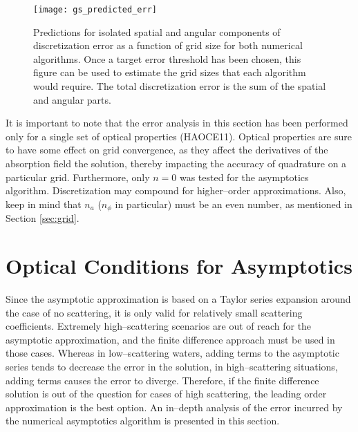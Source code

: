 \begin{figure}[H]
  \centering
  \texttt{[image: gs\_predicted\_err]}
  \caption{Predictions for isolated spatial and angular components of discretization error as a function of grid size for both numerical algorithms. Once a target error threshold has been chosen, this figure can be used to estimate the grid sizes that each algorithm would require. The total discretization error is the sum of the spatial and angular parts.}
  \label{fig:gs_predicted_err}
\end{figure}

It is important to note that the error analysis in this section has been performed only for a single set of optical properties (HAOCE11).
Optical properties are sure to have some effect on grid convergence, as they affect the derivatives of the absorption field the solution, thereby impacting the accuracy of quadrature on a particular grid.
Furthermore, only $n=0$ was tested for the asymptotics algorithm.
Discretization may compound for higher--order approximations.
Also, keep in mind that $n_a$ ($n_\phi$ in particular) must be an even number, as mentioned in Section \ref{sec:grid}.

\section{Optical Conditions for Asymptotics}
Since the asymptotic approximation is based on a Taylor series expansion around the case of no scattering, it is only valid for relatively small scattering coefficients.
Extremely high--scattering scenarios are out of reach for the asymptotic approximation, and the finite difference approach must be used in those cases.
Whereas in low--scattering waters, adding terms to the asymptotic series tends to decrease the error in the solution, in high--scattering situations, adding terms causes the error to diverge.
Therefore, if the finite difference solution is out of the question for cases of high scattering, the leading order approximation is the best option.
An in--depth analysis of the error incurred by the numerical asymptotics algorithm is presented in this section.


